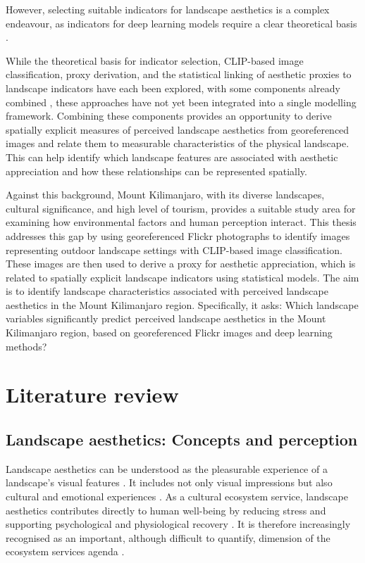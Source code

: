 \documentclass[11pt]{article}
\renewcommand{\_}{\textunderscore\allowbreak{}}
\begin{document}
However, selecting suitable indicators for landscape aesthetics is a complex endeavour, as indicators for deep learning models require a clear theoretical basis \citep{ode_capturing_2008,tribot_integrating_2018}. 

While the theoretical basis for indicator selection, CLIP-based image classification, proxy derivation, and the statistical linking of aesthetic proxies to landscape indicators have each been explored, with some components already combined \citep{liao_oneshot_2025,liao_mapping_2025,vaz_digital_2020}, these approaches have not yet been integrated into a single modelling framework. Combining these components provides an opportunity to derive spatially explicit measures of perceived landscape aesthetics from georeferenced images and relate them to measurable characteristics of the physical landscape. This can help identify which landscape features are associated with aesthetic appreciation and how these relationships can be represented spatially.

Against this background, Mount Kilimanjaro, with its diverse landscapes, cultural significance, and high level of tourism, provides a suitable study area for examining how environmental factors and human perception interact. This thesis addresses this gap by using georeferenced Flickr photographs to identify images representing outdoor landscape settings with CLIP-based image classification. These images are then used to derive a proxy for aesthetic appreciation, which is related to spatially explicit landscape indicators using statistical models. The aim is to identify landscape characteristics associated with perceived landscape aesthetics in the Mount Kilimanjaro region. Specifically, it asks: Which landscape variables significantly predict perceived landscape aesthetics in the Mount Kilimanjaro region, based on georeferenced Flickr images and deep learning methods?



\section{Literature review}\label{sec:LiteratureReview}

\subsection{Landscape aesthetics: Concepts and perception}\label{sec:LAConcepts}

Landscape aesthetics can be understood as the pleasurable experience of a landscape's visual features \citep{tribot_integrating_2018}. It includes not only visual impressions but also cultural and emotional experiences \citep{bourassa_toward_1988}. As a cultural ecosystem service, landscape aesthetics contributes directly to human well-being by reducing stress and supporting psychological and physiological recovery \citep{gobster_shared_2007}. It is therefore increasingly recognised as an important, although difficult to quantify, dimension of the ecosystem services agenda \citep{daniel_contributions_2012}.
\end{document}
